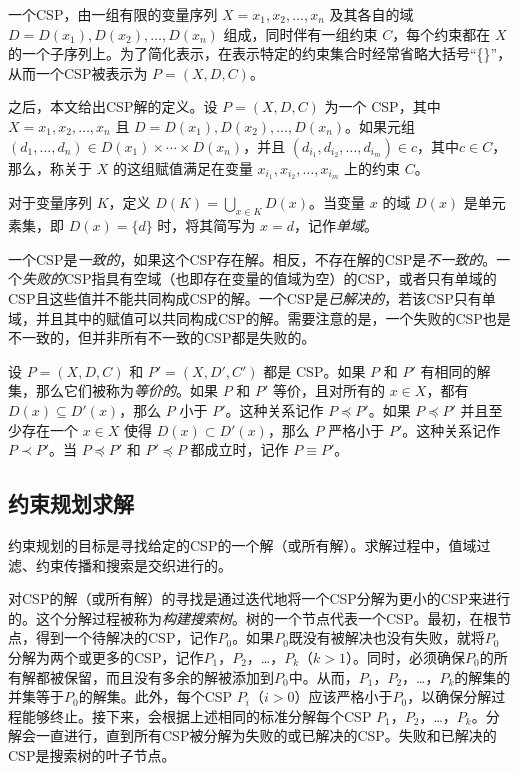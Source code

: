 \begin{definition}
    一个CSP，由一组有限的变量序列 $X = x_1, x_2, . . . , x_n$ 及其各自的域 $D = D(x_1), D(x_2), \dots, D(x_n)$ 组成，同时伴有一组约束 $C$，每个约束都在 $X$ 的一个子序列上。为了简化表示，在表示特定的约束集合时经常省略大括号“\{\}”，从而一个CSP被表示为 $P = (X, D, C)$。
\end{definition}

之后，本文给出CSP解的定义。设 $P = (X, D, C)$ 为一个 CSP，其中 $X = x_1, x_2, \dots, x_n$ 且 $D = D(x_1), D(x_2), \dots, D(x_n)$。如果元组 $(d_1, \dots, d_n) \in D(x_1) \times \cdots \times D(x_n)$，并且 $(d_{i_1}, d_{i_2}, \dots, d_{i_m}) \in c$，其中$c \in C$，那么，称关于 $X$ 的这组赋值满足在变量 $x_{i_1}, x_{i_2}, \dots, x_{i_m}$ 上的约束 $C$。

对于变量序列 $K$，定义 $D(K) = \bigcup_{x \in K} D(x)$。当变量 $x$ 的域 $D(x)$ 是单元素集，即 $D(x) = \{d\}$ 时，将其简写为 $x = d$，记作\textit{单域}。

一个CSP是\textit{一致的}，如果这个CSP存在解。相反，不存在解的CSP是\textit{不一致的}。一个\textit{失败的}CSP指具有空域（也即存在变量的值域为空）的CSP，或者只有单域的CSP且这些值并不能共同构成CSP的解。一个CSP是\textit{已解决的}，若该CSP只有单域，并且其中的赋值可以共同构成CSP的解。需要注意的是，一个失败的CSP也是不一致的，但并非所有不一致的CSP都是失败的。

设 $P = (X, D, C)$ 和 $P' = (X , D', C')$ 都是 CSP。如果 $P$ 和 $P'$ 有相同的解集，那么它们被称为\textit{等价的}。如果 $P$ 和 $P'$ 等价，且对所有的 $x \in X$，都有 $D(x) \subseteq D'(x)$，那么 $P$ 小于 $P'$。这种关系记作 $P \preceq P'$。如果 $P \preceq P'$ 并且至少存在一个 $x \in X$ 使得 $D(x) \subset D'(x)$，那么 $P$ 严格小于 $P'$。这种关系记作 $P \prec P'$。当 $P \preceq P'$ 和 $P' \preceq P$ 都成立时，记作 $P \equiv P'$。

\subsection{约束规划求解}

约束规划的目标是寻找给定的CSP的一个解（或所有解）。求解过程中，值域过滤、约束传播和搜索是交织进行的。

对CSP的解（或所有解）的寻找是通过迭代地将一个CSP分解为更小的CSP来进行的。这个分解过程被称为\textit{构建搜索树}。树的一个节点代表一个CSP。最初，在根节点，得到一个待解决的CSP，记作$P_0$。如果$P_0$既没有被解决也没有失败，就将$P_0$分解为两个或更多的CSP，记作$P_1$，$P_2$，…，$P_k$（$k>1$）。同时，必须确保$P_0$的所有解都被保留，而且没有多余的解被添加到$P_0$中。从而，$P_1$，$P_2$，…，$P_k$的解集的并集等于$P_0$的解集。此外，每个CSP $P_i$（$i>0$）应该严格小于$P_0$，以确保分解过程能够终止。接下来，会根据上述相同的标准分解每个CSP $P_1$，$P_2$，…，$P_k$。分解会一直进行，直到所有CSP被分解为失败的或已解决的CSP。失败和已解决的CSP是搜索树的叶子节点。

